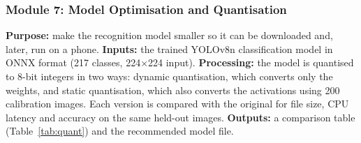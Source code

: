 

\subsubsection{Module 7: Model Optimisation and Quantisation}
\textbf{Purpose:} make the recognition model smaller so it can be downloaded
and, later, run on a phone. \textbf{Inputs:} the trained YOLOv8n classification
model in ONNX format (217 classes, 224$\times$224 input).
\textbf{Processing:} the model is quantised to 8-bit integers in two ways:
dynamic quantisation, which converts only the weights, and static quantisation,
which also converts the activations using 200 calibration images. Each version
is compared with the original for file size, CPU latency and accuracy on the
same held-out images. \textbf{Outputs:} a comparison table (Table~\ref{tab:quant})
and the recommended model file.


